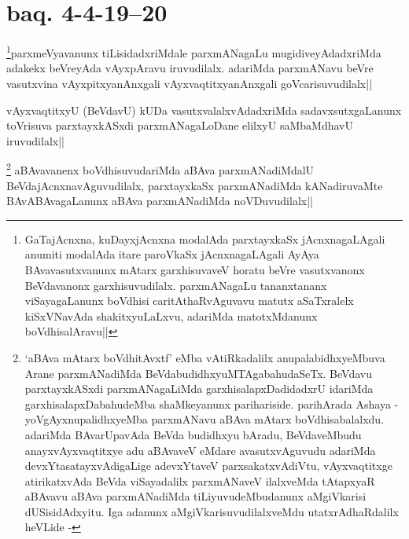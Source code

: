 
\section*{baq. 4-4-19--20}

\begin{artha}
\footnote[1]{GaTajAcnxna, kuDayxjAcnxna modalAda parxtayxkaSx 
jAcnxnagaLAgali anumiti modalAda itare paroVkaSx jAcnxnagaLAgali AyAya 
BAvavasutxvanunx mAtarx garxhisuvaveV horatu beVre vasutxvanonx 
BeVdavanonx garxhisuvudilalx. parxmANagaLu tananxtananx viSayagaLanunx 
boVdhisi caritAthaRvAguvavu matutx aSaTxralelx kiSxVNavAda 
shakitxyuLaLxvu, adariMda matotxMdanunx boVdhisalAravu||}parxmeVyavanunx tiLisidadxriMdale parxmANagaLu mugidiveyAdadxriMda 
adakekx beVreyAda vAyxpAravu iruvudilalx. adariMda parxmANavu beVre 
vasutxvina vAyxpitxyanAnxgali vAyxvaqtitxyanAnxgali goVcarisuvudilalx||
\end{artha}

\begin{artha}
vAyxvaqtitxyU (BeVdavU) kUDa vasutxvalalxvAdadxriMda 
sadavxsutxgaLanunx toVrisuva parxtayxkASxdi parxmANagaLoDane elilxyU 
saMbaMdhavU iruvudilalx||
\end{artha}

\begin{artha} 
\footnote[1]{`aBAva mAtarx boVdhitAvxtf' eMba vAtiRkadalilx 
anupalabidhxyeMbuva Arane parxmANadiMda BeVdabudidhxyuMTAgabahudaSeTx. 
BeVdavu parxtayxkASxdi parxmANagaLiMda garxhisalapxDadidadxrU idariMda 
garxhisalapxDabahudeMba shaMkeyanunx parihariside. parihArada Ashaya - 
yoVgAyxnupalidhxyeMba parxmANavu aBAva mAtarx boVdhisabalalxdu. 
adariMda BAvarUpavAda BeVda budidhxyu bAradu, BeVdaveMbudu 
anayxvAyxvaqtitxye adu aBAvaveV eMdare avasutxvAguvudu adariMda 
devxYtasatayxvAdigaLige adevxYtaveV parxsakatxvAdiVtu, vAyxvaqtitxge 
atirikatxvAda BeVda viSayadalilx parxmANaveV ilalxveMda tAtapxyaR 
aBAvavu aBAva parxmANadiMda tiLiyuvudeMbudanunx aMgiVkarisi 
dUSisidAdxyitu. Iga adanunx aMgiVkarisuvudilalxveMdu utatxrAdhaRdalilx 
heVLide -} aBAvavanenx boVdhisuvudariMda aBAva parxmANadiMdalU 
BeVdajAcnxnavAguvudilalx, parxtayxkaSx parxmANadiMda kANadiruvaMte 
BAvABAvagaLanunx aBAva parxmANadiMda noVDuvudilalx||
\end{artha}

\begin{artha} 

\end{artha}

\begin{artha} 

\end{artha}


